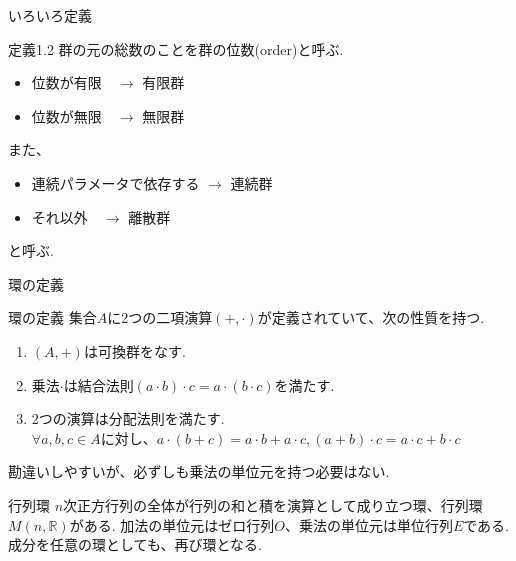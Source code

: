 \documentclass[dvipdfmx,11pt,notheorems]{beamer}
\begin{document}
\begin{frame}{いろいろ定義}
  \begin{block}{定義1.2}
    群の元の総数のことを群の\alert{位数}(order)と呼ぶ.
    \begin{itemize}
      \item 位数が有限　$\rightarrow$ \alert{有限群}
      \item 位数が無限　$\rightarrow$ \alert{無限群}
    \end{itemize}
    また、
    \begin{itemize}
      \item 連続パラメータで依存する $\rightarrow$ \alert{連続群}
      \item それ以外　$\rightarrow$ \alert{離散群}
    \end{itemize}
    と呼ぶ.
  \end{block}
\end{frame}

\begin{frame}{環の定義}
  \begin{block}{環の定義}
    集合$A$に2つの二項演算$(+,\cdot)$が定義されていて、次の性質を持つ.
    \begin{enumerate}
      \item $(A,+)$は可換群をなす.
      \item 乗法$\cdot$は結合法則$(a\cdot b)\cdot c=a\cdot(b\cdot c)$を満たす.
      \item 2つの演算は\alert{分配法則}を満たす.\\
      $\forall a,b,c \in A$に対し、$a\cdot(b+c)=a\cdot b + a\cdot c,    (a+b)\cdot c=a\cdot c+b\cdot c$
    \end{enumerate}
    勘違いしやすいが、必ずしも乗法の単位元を持つ必要はない. \\

  \end{block}
  \begin{exampleblock}{行列環}
    $n$次正方行列の全体が行列の和と積を演算として成り立つ環、行列環$M(n,\mathbb{R})$がある. 加法の単位元はゼロ行列$O$、乗法の単位元は単位行列$E$である.\\
    成分を任意の環としても、再び環となる.
  \end{exampleblock}
\end{frame}
\end{document}
